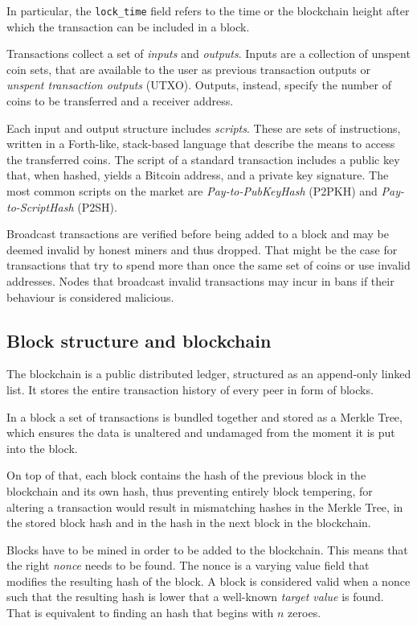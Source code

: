 \documentclass[12pt, letterpaper, twoside]{article}
\begin{document}
In particular, the \texttt{lock\_time} field refers to the time or the blockchain height after which the transaction can be included in a block.

Transactions collect a set of \emph{inputs} and \emph{outputs}. Inputs are a collection of unspent coin sets, that are available to the user as previous transaction outputs or \textit{unspent transaction outputs} (UTXO). Outputs, instead, specify the number of coins to be transferred and a receiver address.

Each input and output structure includes \emph{scripts}. These are sets of instructions, written in a Forth-like, stack-based language that describe the means to access the transferred coins. The script of a standard transaction includes a public key that, when hashed, yields a Bitcoin address, and a private key signature. The most common scripts on the market are \emph{Pay-to-PubKeyHash} (P2PKH) and \emph{Pay-to-ScriptHash} (P2SH).

Broadcast transactions are verified before being added to a block and may be deemed invalid by honest miners and thus dropped. That might be the case for transactions that try to spend more than once the same set of coins or use invalid addresses. Nodes that broadcast invalid transactions may incur in bans if their behaviour is considered malicious.

\subsection{Block structure and blockchain}\label{sec:block}
The blockchain is a public distributed ledger, structured as an append-only linked list. It stores the entire transaction history of every peer in form of blocks.

In a block a set of transactions is bundled together and stored as a Merkle Tree, which ensures the data is unaltered and undamaged from the moment it is put into the block.

On top of that, each block contains the hash of the previous block in the blockchain and its own hash, thus preventing entirely block tempering, for altering a transaction would result in mismatching hashes in the Merkle Tree, in the stored block hash and in the hash in the next block in the blockchain.

Blocks have to be mined in order to be added to the blockchain. This means that the right \emph{nonce} needs to be found. The nonce is a varying value field that modifies the resulting hash of the block. A block is considered valid when a nonce such that the resulting hash is lower that a well-known \emph{target value} is found. That is equivalent to finding an hash that begins with $n$ zeroes.
\end{document}
